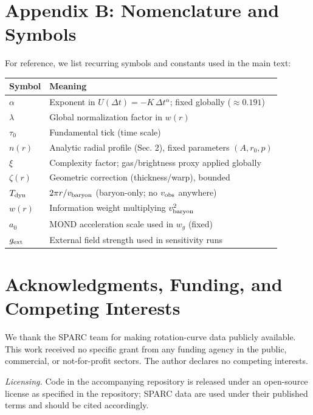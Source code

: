\documentclass[12pt,a4paper]{article}
\begin{document}
\section*{Appendix B: Nomenclature and Symbols}
\noindent For reference, we list recurring symbols and constants used in the main text:
\begin{center}
\begin{tabular}{ll}
\toprule
Symbol & Meaning \\
\midrule
$\alpha$ & Exponent in $U(\Delta t)=-K\,\Delta t^{\alpha}$; fixed globally ($\approx0.191$) \\
$\lambda$ & Global normalization factor in $w(r)$ \\
$\tau_0$ & Fundamental tick (time scale) \\
$n(r)$ & Analytic radial profile (Sec. 2), fixed parameters $(A,r_0,p)$ \\
$\xi$ & Complexity factor; gas/brightness proxy applied globally \\
$\zeta(r)$ & Geometric correction (thickness/warp), bounded \\
$T_{\rm dyn}$ & $2\pi r/v_{\rm baryon}$ (baryon-only; no $v_{\rm obs}$ anywhere) \\
$w(r)$ & Information weight multiplying $v_{\rm baryon}^2$ \\
$a_0$ & MOND acceleration scale used in $w_g$ (fixed) \\
$g_{\rm ext}$ & External field strength used in sensitivity runs \\
\bottomrule
\end{tabular}
\end{center}

\section*{Acknowledgments, Funding, and Competing Interests}
\noindent We thank the SPARC team for making rotation-curve data publicly available. This work received no specific grant from any funding agency in the public, commercial, or not-for-profit sectors. The author declares no competing interests.

\noindent \textit{Licensing.} Code in the accompanying repository is released under an open-source license as specified in the repository; SPARC data are used under their published terms and should be cited accordingly.
\end{document}
